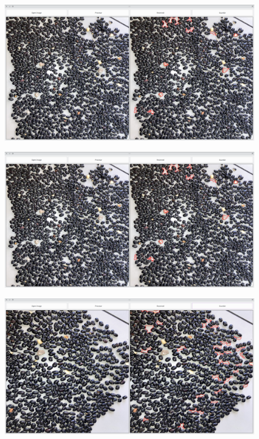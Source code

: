 \documentclass[conference]{IEEEtran}
\begin{document}
    \begin{figure}[H]
        \centering
        \includegraphics[width=\breite\linewidth]{images/test2.png}
        \caption{}
        \label{fig:test2}
    \end{figure}

    \begin{figure}[H]
        \centering
        \includegraphics[width=\breite\linewidth]{images/test3.png}
        \caption{}
        \label{fig:test3}
    \end{figure}

    \begin{figure}[H]
        \centering
        \includegraphics[width=\breite\linewidth]{images/test4.png}
        \caption{}
        \label{fig:test4}
    \end{figure}
\end{document}
